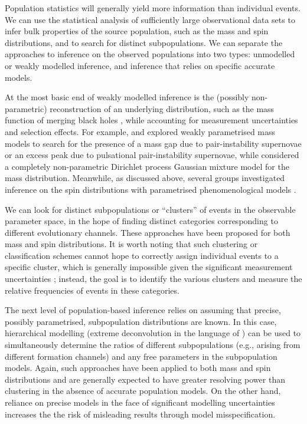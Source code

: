 \documentclass[review]{elsarticle}
\begin{document}
Population statistics will generally yield more information than individual events.  We can use the statistical analysis of sufficiently large observational data sets to infer bulk properties of the source population, such as the mass and spin distributions, and to search for distinct subpopulations.  We can separate the approaches to inference on the observed populations into two types: unmodelled or weakly modelled inference, and inference that relies on specific accurate models. 

At the most basic end of weakly modelled inference is the (possibly non-parametric) reconstruction of an underlying distribution, such as the mass function of merging black holes \citep{BBH:O1,GWTC2:pop,GWTC3:pop}, while accounting for measurement uncertainties and selection effects.  For example, \citet{Fishbach:2017mass} and \citet{Edelman:2021} explored weakly parametrised mass models to search for the presence of a mass gap due to pair-instability supernovae or an excess peak due to pulsational pair-instability supernovae, while \citet{RinaldiDelPozzo:2021} considered a completely non-parametric Dirichlet process Gaussian mixture model for the mass distribution.  Meanwhile, as discussed above, several groups investigated inference on the spin distributions with parametrised phenomenological models \citep[e.g.,][]{TalbotThrane:2017,GWTC2:pop,Callister:2021,Galaudage:2021}.  

We can look for distinct subpopulations or ``clusters'' of events in the observable parameter space, in the hope of finding distinct categories corresponding to different evolutionary channels.  These approaches have been proposed for both mass \citep{Mandel:2015,Mandel:2016cluster} and spin \citep{Farr:2018,Powell:2019} distributions.  It is worth noting that such clustering or classification schemes cannot hope to correctly assign individual events to a specific cluster, which is generally impossible given the significant measurement uncertainties \citep{Littenberg:2015}; instead, the goal is to identify the various clusters and measure the relative frequencies of events in these categories.

The next level of population-based inference relies on assuming that precise, possibly parametrised, subpopulation distributions are known.  In this case, hierarchical modelling (extreme deconvolution in the language of \cite{Hogg:2010}) can be used to simultaneously determine the ratios of different subpopulations (e.g., arising from different formation channels) and any free parameters in the subpopulation models.  Again, such approaches have been applied to both mass \citep[e.g.,][]{Zevin:2017} and spin \citep[e.g.,][]{Vitale:2015,Stevenson:2017spin} distributions and are generally expected to have greater resolving power than clustering in the absence of accurate population models.  On the other hand, reliance on precise models in the face of significant modelling uncertainties \citep[e.g.,][]{Belczynski:2021} increases the  the risk of misleading results through model misspecification.
\end{document}
